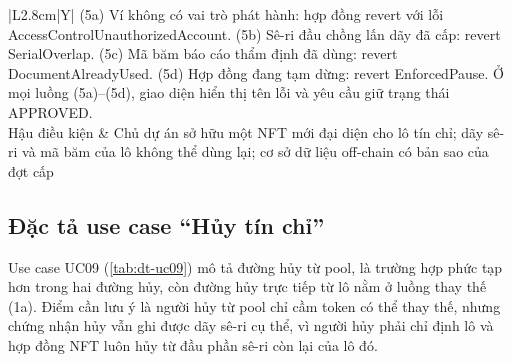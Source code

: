 \begin{table}[!htbp]
\begin{tabularx}{\textwidth}{|L{2.8cm}|Y|}
        (5a) Ví không có vai trò phát hành: hợp đồng revert với lỗi AccessControlUnauthorizedAccount.\newline
        (5b) Sê-ri đầu chồng lấn dãy đã cấp: revert SerialOverlap.\newline
        (5c) Mã băm báo cáo thẩm định đã dùng: revert DocumentAlreadyUsed.\newline
        (5d) Hợp đồng đang tạm dừng: revert EnforcedPause.\newline
        Ở mọi luồng (5a)–(5d), giao diện hiển thị tên lỗi và yêu cầu giữ trạng thái APPROVED. \\
        \hline
        Hậu điều kiện & Chủ dự án sở hữu một NFT mới đại diện cho lô tín chỉ; dãy sê-ri và mã băm của lô không thể dùng lại; cơ sở dữ liệu off-chain có bản sao của đợt cấp \\
        \hline
    \end{tabularx}
\end{table}

\subsection*{Đặc tả use case ``Hủy tín chỉ''}
\label{subsec:dt-uc09}

Use case UC09 (\autoref{tab:dt-uc09}) mô tả đường hủy từ pool, là trường hợp phức tạp hơn trong hai đường hủy, còn đường hủy trực tiếp từ lô nằm ở luồng thay thế (1a). Điểm cần lưu ý là người hủy từ pool chỉ cầm token có thể thay thế, nhưng chứng nhận hủy vẫn ghi được dãy sê-ri cụ thể, vì người hủy phải chỉ định lô và hợp đồng NFT luôn hủy từ đầu phần sê-ri còn lại của lô đó.

